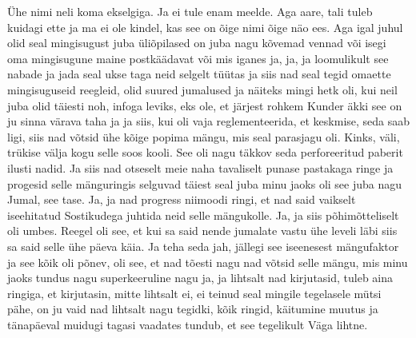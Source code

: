 Ühe nimi neli koma ekselgiga. Ja ei tule enam meelde. Aga aare, tali tuleb kuidagi ette ja ma ei ole kindel, kas see on õige nimi õige näo ees. Aga igal juhul olid seal mingisugust juba üliõpilased on juba nagu kõvemad vennad või isegi oma mingisugune maine postkäädavat või mis iganes ja, ja, ja loomulikult see nabade ja jada seal ukse taga neid selgelt tüütas ja siis nad seal tegid omaette mingisuguseid reegleid, olid suured jumalused ja näiteks mingi hetk oli, kui neil juba olid täiesti noh, infoga leviks, eks ole, et järjest rohkem Kunder äkki see on ju sinna värava taha ja ja siis, kui oli vaja reglementeerida, et keskmise, seda saab ligi, siis nad võtsid ühe kõige popima mängu, mis seal parasjagu oli. Kinks, väli, trükise välja kogu selle soos kooli. See oli nagu täkkov seda perforeeritud paberit ilusti nadid. Ja siis nad otseselt meie naha tavaliselt punase pastakaga ringe ja progesid selle mänguringis selguvad täiest seal juba minu jaoks oli see juba nagu Jumal, see tase. Ja, ja nad progress niimoodi ringi, et nad said vaikselt iseehitatud Sostikudega juhtida neid selle mängukolle. Ja, ja siis põhimõtteliselt oli umbes. Reegel oli see, et kui sa said nende jumalate vastu ühe leveli läbi siis sa said selle ühe päeva käia. Ja teha seda jah, jällegi see iseenesest mängufaktor ja see kõik oli põnev, oli see, et nad tõesti nagu nad võtsid selle mängu, mis minu jaoks tundus nagu superkeeruline nagu ja, ja lihtsalt nad kirjutasid, tuleb aina ringiga, et kirjutasin, mitte lihtsalt ei, ei teinud seal mingile tegelasele mütsi pähe, on ju vaid nad lihtsalt nagu tegidki, kõik ringid, käitumine muutus ja tänapäeval muidugi tagasi vaadates tundub, et see tegelikult
Väga lihtne.

